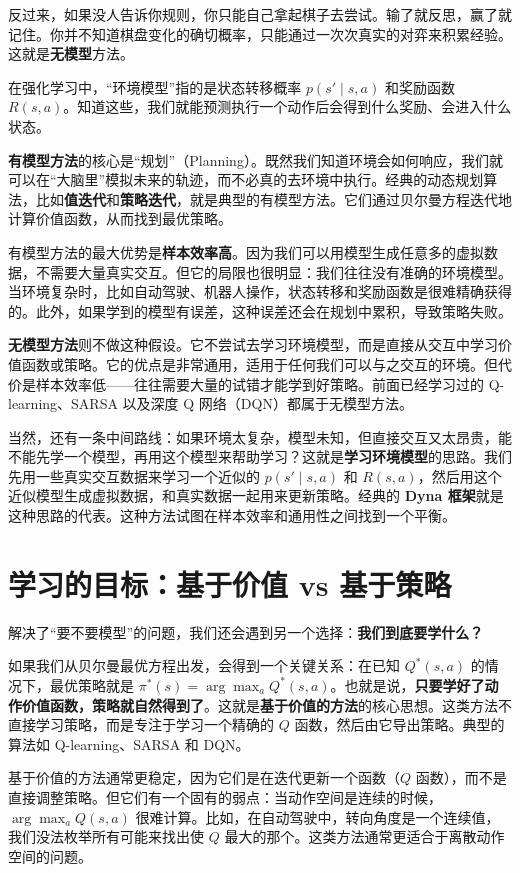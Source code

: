 \documentclass[lang=cn,zihao=-4,a4paper,fontset=windows]{beautybook}
\begin{document}
反过来，如果没人告诉你规则，你只能自己拿起棋子去尝试。输了就反思，赢了就记住。你并不知道棋盘变化的确切概率，只能通过一次次真实的对弈来积累经验。这就是\textbf{无模型}方法。

在强化学习中，“环境模型”指的是状态转移概率 \(p(s' \mid s, a)\) 和奖励函数 \(R(s, a)\)。知道这些，我们就能预测执行一个动作后会得到什么奖励、会进入什么状态。

\textbf{有模型方法}的核心是“规划”（Planning）。既然我们知道环境会如何响应，我们就可以在“大脑里”模拟未来的轨迹，而不必真的去环境中执行。经典的动态规划算法，比如\textbf{值迭代}和\textbf{策略迭代}，就是典型的有模型方法。它们通过贝尔曼方程迭代地计算价值函数，从而找到最优策略。

有模型方法的最大优势是\textbf{样本效率高}。因为我们可以用模型生成任意多的虚拟数据，不需要大量真实交互。但它的局限也很明显：我们往往没有准确的环境模型。当环境复杂时，比如自动驾驶、机器人操作，状态转移和奖励函数是很难精确获得的。此外，如果学到的模型有误差，这种误差还会在规划中累积，导致策略失败。

\textbf{无模型方法}则不做这种假设。它不尝试去学习环境模型，而是直接从交互中学习价值函数或策略。它的优点是非常通用，适用于任何我们可以与之交互的环境。但代价是样本效率低——往往需要大量的试错才能学到好策略。前面已经学习过的 Q-learning、SARSA 以及深度 Q 网络（DQN）都属于无模型方法。

当然，还有一条中间路线：如果环境太复杂，模型未知，但直接交互又太昂贵，能不能先学一个模型，再用这个模型来帮助学习？这就是\textbf{学习环境模型}的思路。我们先用一些真实交互数据来学习一个近似的 \(p(s' \mid s, a)\) 和 \(R(s, a)\)，然后用这个近似模型生成虚拟数据，和真实数据一起用来更新策略。经典的 \textbf{Dyna 框架}就是这种思路的代表。这种方法试图在样本效率和通用性之间找到一个平衡。

\section{学习的目标：基于价值 vs 基于策略}

解决了“要不要模型”的问题，我们还会遇到另一个选择：\textbf{我们到底要学什么？}

如果我们从贝尔曼最优方程出发，会得到一个关键关系：在已知 \(Q^*(s,a)\) 的情况下，最优策略就是 \(\pi^*(s) = \arg\max_a Q^*(s,a)\)。也就是说，\textbf{只要学好了动作价值函数，策略就自然得到了}。这就是\textbf{基于价值的方法}的核心思想。这类方法不直接学习策略，而是专注于学习一个精确的 \(Q\) 函数，然后由它导出策略。典型的算法如 Q-learning、SARSA 和 DQN。

基于价值的方法通常更稳定，因为它们是在迭代更新一个函数（\(Q\) 函数），而不是直接调整策略。但它们有一个固有的弱点：当动作空间是连续的时候，\(\arg\max_a Q(s,a)\) 很难计算。比如，在自动驾驶中，转向角度是一个连续值，我们没法枚举所有可能来找出使 \(Q\) 最大的那个。这类方法通常更适合于离散动作空间的问题。
\end{document}
